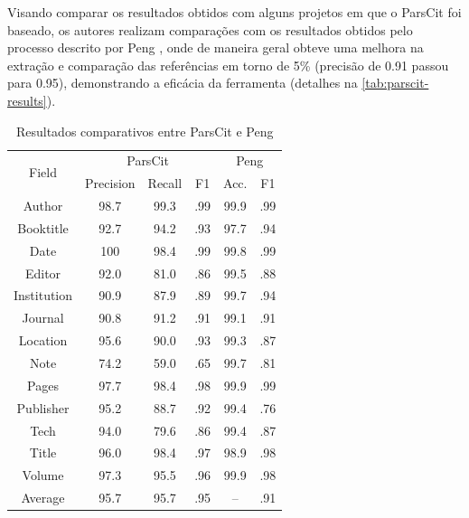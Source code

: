 Visando comparar os resultados obtidos com alguns projetos em que o ParsCit foi baseado, os autores realizam comparações com os resultados obtidos pelo processo descrito por Peng \cite{Peng-CRF-IE}, onde de maneira geral obteve uma melhora na extração e comparação das referências em torno de 5\% (precisão de 0.91 passou para 0.95), demonstrando a eficácia da ferramenta (detalhes na \autoref{tab:parscit-results}).

\begin{table}
    \caption{Resultados comparativos entre ParsCit e Peng \cite{Peng-CRF-IE}}
    \begin{center}
        \begin{tabular}{|c|c|c|c|c|c|}
            \hline 
            \multirow{2}{*}{Field} & \multicolumn{3}{c|}{ParsCit} & \multicolumn{2}{c|}{Peng} \\
            \cline{2-6}
             & Precision & Recall & F1 & Acc. & F1 \\ 
            \hline
            Author & 98.7 & 99.3 & .99 & 99.9 & .99 \\
            Booktitle & 92.7 & 94.2 & .93 & 97.7 & .94 \\
            Date & 100 & 98.4 & .99 & 99.8 & .99 \\
            Editor & 92.0 & 81.0 & .86 & 99.5 & .88 \\
            Institution & 90.9 & 87.9 & .89 & 99.7 & .94 \\
            Journal & 90.8 & 91.2 & .91 & 99.1 & .91 \\
            Location & 95.6 & 90.0 & .93 & 99.3 & .87 \\
            Note & 74.2 & 59.0 & .65 & 99.7 & .81 \\
            Pages & 97.7 & 98.4 & .98 & 99.9 & .99  \\
            Publisher & 95.2 & 88.7 & .92 & 99.4 & .76 \\
            Tech & 94.0 & 79.6 & .86 & 99.4 & .87 \\
            Title & 96.0 & 98.4 & .97 & 98.9 & .98 \\
            Volume & 97.3 & 95.5 & .96 & 99.9 & .98 \\
            \hline
            Average & 95.7 & 95.7 & .95 & – & .91 \\
            \hline
        \end{tabular}
    \end{center}
    \label{tab:parscit-results}
\end{table}

